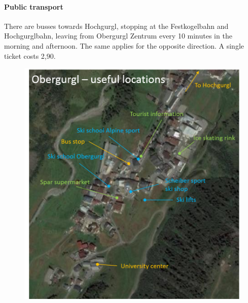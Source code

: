 \paragraph{Public transport} There are busses towards Hochgurgl, stopping at the Festkogelbahn and Hochgurglbahn, leaving from Obergurgl Zentrum every 10 minutes in the morning and afternoon. The same applies for the opposite direction. A single ticket costs 2,90. 

\begin{figure}
	\centering
	\includegraphics[width=1\textwidth]{map}

\end{figure}


